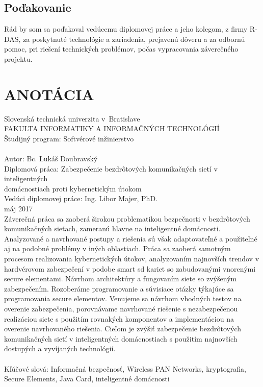 \documentclass[12pt,a4wide,oneside,openright]{report}
\begin{document}
\section*{Poďakovanie}
Rád by som sa poďakoval vedúcemu diplomovej práce a jeho kolegom, z firmy R-DAS, za poskytnuté technológie a zariadenia, prejavenú dôveru a za odbornú pomoc, pri riešení technických problémov, počas vypracovania záverečného projektu.

\newpage
\thispagestyle{empty}
\mbox{}

\onehalfspacing
\chapter*{ANOTÁCIA}	
\thispagestyle{empty}
\noindent Slovenská technická univerzita v~Bratislave \\
FAKULTA INFORMATIKY A INFORMAČNÝCH TECHNOLÓGIÍ \\
Študijný program: \tabto{4.7cm}Softvérové inžinierstvo \\ \\
Autor: \tabto{4.7cm}Bc. Lukáš Doubravský \\
Diplomová práca: 
\tabto{4.7cm}Zabezpečenie bezdrôtových komunikačných sietí v inteligentných\\ \tabto{4.7cm}domácnostiach proti kybernetickým útokom  \\
Vedúci diplomovej práce: \tabto{4.7cm}Ing. Libor Majer, PhD. \\
máj 2017 \\

Záverečná práca sa zaoberá širokou problematikou bezpečnosti v bezdrôtových komunikačných sieťach, zameranú hlavne na inteligentné domácnosti. Analyzované a navrhované postupy a riešenia sú však adaptovateľné a použiteľné aj na podobné problémy v iných oblastiach.
Práca sa zaoberá samotným procesom realizovania kybernetických útokov, analyzovaním najnovších trendov v hardvérovom zabezpečení v podobe smart sd kariet so zabudovanými vnorenými secure elementami. Návrhom architektúry a fungovaním siete so zvýšeným zabezpečením.
Rozoberáme programovanie a súvisiace otázky týkajúce sa programovania secure elementov.
Venujeme sa návrhom vhodných testov na overenie zabezpečenia, porovnávame navrhované riešenie s nezabezpečenou realizáciou siete s použitím rovnakých komponentov a implementáciou na overenie navrhovaného riešenia.
Cieľom je zvýšiť zabezpečenie bezdrôtových komunikačných sietí v inteligentných domácnostiach s použitím najnovších dostupých a vyvíjaných technológií.
\\ \\
Kľúčové slová: Informačná bezpečnosť, Wireless PAN Networks, kryptografia, Secure Elements, Java Card, inteligentné domácnosti
\end{document}
